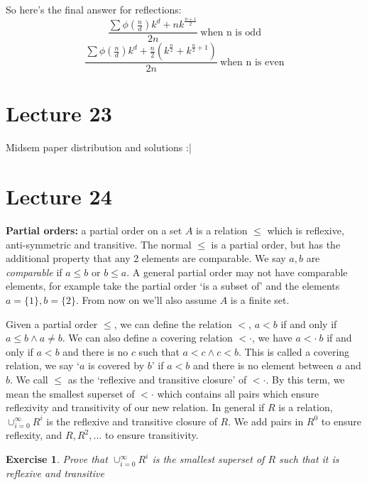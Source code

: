 \documentclass[a4paper,10pt]{article}
\newtheorem{exercise}{Exercise}[section]
\theoremstyle{definition} %
\begin{document}
    \newpage
    So here's the final answer for reflections:
    \[ \frac{\sum \phi(\frac{n}{d})k^d + nk^{\frac{n+1}{2}}}{2n}\ \text{when n is odd} \]
    \[ \frac{\sum \phi(\frac{n}{d})k^d + \frac{n}{2}(k^{\frac{n}{2}} + k^{\frac{n}{2}+1})}{2n}\ \text{when n is even} \]


    \section{Lecture 23} 
    
    Midsem paper distribution and solutions :|

    \section{Lecture 24}

    \textbf{Partial orders:} a partial order on a set $A$ is a relation $\leq$ which is reflexive, anti-symmetric and transitive. The normal $\leq$ is a partial order, but has 
    the additional property that any 2 elements are comparable. We say $a, b$ are \emph{comparable} if $a \leq b$ or $b \leq a$. A general partial order may not have comparable
    elements, for example take the partial order `is a subset of' and the elements $a = \{1\}, b = \{2\}$. From now on we'll also assume $A$ is a finite set.

    Given a partial order $\leq$, we can define the relation $<$, $a<b$ if and only if $a \leq b \land a \neq b$. We can also define a covering relation $<\cdot$, we have $a < \cdot \ b$
    if and only if $a<b$ and there is no $c$ such that $a<c \land c<b$. This is called a covering relation, we say `$a$ is covered by $b$' if $a<b$ and there is no element between $a$ and $b$.
    We call $\leq$ as the `reflexive and transitive closure' of $<\cdot$. By this term, we mean the smallest superset of $<\cdot$ which contains all pairs which ensure reflexivity and transitivity 
    of our new relation. In general if $R$ is a relation, $\cup_{i=0}^{\infty} R^i$ is the reflexive and transitive closure of $R$. We add pairs in $R^0$ to ensure reflexity, and $R, R^2, \dots$ to 
    ensure transitivity.

    \begin{exercise}
        Prove that $\cup_{i=0}^{\infty} R^i$ is the smallest superset of $R$ such that it is reflexive and transitive
    \end{exercise}
\end{document}
